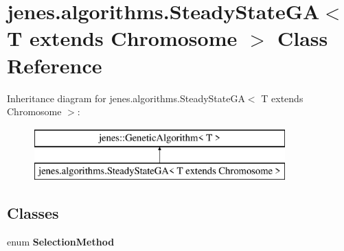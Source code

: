 \hypertarget{classjenes_1_1algorithms_1_1_steady_state_g_a_3_01_t_01extends_01_chromosome_01_4}{\section{jenes.\-algorithms.\-Steady\-State\-G\-A$<$ T extends Chromosome $>$ Class Reference}
\label{classjenes_1_1algorithms_1_1_steady_state_g_a_3_01_t_01extends_01_chromosome_01_4}
}
Inheritance diagram for jenes.\-algorithms.\-Steady\-State\-G\-A$<$ T extends Chromosome $>$\-:\begin{figure}[H]
\begin{center}
\leavevmode
\includegraphics[height=2.000000cm]{classjenes_1_1algorithms_1_1_steady_state_g_a_3_01_t_01extends_01_chromosome_01_4}
\end{center}
\end{figure}
\subsection*{Classes}
\begin{DoxyCompactItemize}
\item 
enum {\bfseries Selection\-Method}
\end{DoxyCompactItemize}

